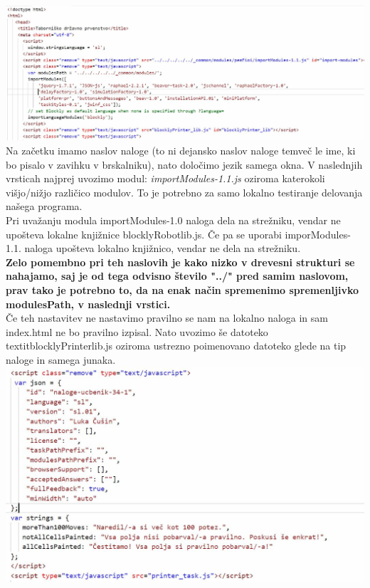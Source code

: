 \documentclass[11pt]{article} %
\begin{document}
\includegraphics[scale=0.5]{index_splosno_zacetek}\\

Na začetku imamo naslov naloge (to ni dejansko naslov naloge temveč le ime, ki bo pisalo v zavihku v brskalniku), nato določimo jezik samega okna. V naslednjih vrsticah najprej uvozimo modul: \textit{importModules-1.1.js} oziroma katerokoli višjo/nižjo različico modulov. To je potrebno za samo lokalno testiranje delovanja našega programa. \\[0.5cm]
Pri uvažanju modula importModules-1.0 naloga dela na strežniku, vendar ne upošteva lokalne knjižnice blocklyRobot\textunderscore lib.js. Če pa se uporabi imporModules-1.1. naloga upošteva lokalno knjižnico, vendar ne dela na strežniku.\\[0.5cm]
\textbf{Zelo pomembno pri teh naslovih je kako nizko v drevesni strukturi se nahajamo, saj je od tega odvisno število "../" pred samim naslovom, prav tako je potrebno to, da na enak način spremenimo spremenljivko modulesPath, v naslednji vrstici.}\\[0.5cm]
Če teh nastavitev ne nastavimo pravilno se nam na lokalno naloga in sam index.html ne bo pravilno izpisal.
Nato uvozimo še datoteko textit{blocklyPrinter\textunderscore lib.js} oziroma ustrezno poimenovano datoteko glede na tip naloge in samega junaka.       \\[0.5cm]

\includegraphics[scale=0.6]{index_splosno_json_spremenljivka}\\
\end{document}
